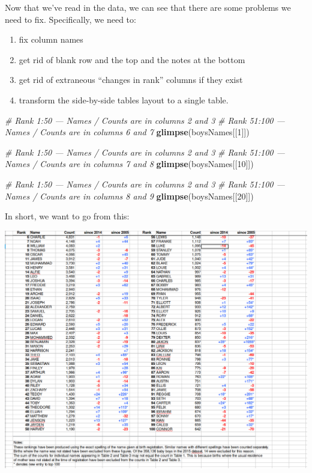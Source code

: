 \documentclass[
]{book}
\newenvironment{Shaded}{\begin{snugshade}}{\end{snugshade}}
\newcommand{\CommentTok}[1]{\textcolor[rgb]{0.56,0.35,0.01}{\textit{#1}}}
\newcommand{\DecValTok}[1]{\textcolor[rgb]{0.00,0.00,0.81}{#1}}
\newcommand{\KeywordTok}[1]{\textcolor[rgb]{0.13,0.29,0.53}{\textbf{#1}}}
\newcommand{\NormalTok}[1]{#1}
\providecommand{\tightlist}{%
  \setlength{\itemsep}{0pt}\setlength{\parskip}{0pt}}
\begin{document}
Now that we've read in the data, we can see that there are some
problems we need to fix. Specifically, we need to:

\begin{enumerate}
\def\labelenumi{\arabic{enumi}.}
\tightlist
\item
  fix column names
\item
  get rid of blank row and the top and the notes at the bottom
\item
  get rid of extraneous ``changes in rank'' columns if they exist
\item
  transform the side-by-side tables layout to a single table.
\end{enumerate}

\begin{Shaded}
\begin{Highlighting}[]
\CommentTok{# Rank 1:50 --- Names / Counts are in columns 2 and 3 }
\CommentTok{# Rank 51:100 --- Names / Counts are in columns 6 and 7}
\KeywordTok{glimpse}\NormalTok{(boysNames[[}\DecValTok{1}\NormalTok{]]) }

\CommentTok{# Rank 1:50 --- Names / Counts are in columns 2 and 3 }
\CommentTok{# Rank 51:100 --- Names / Counts are in columns 7 and 8}
\KeywordTok{glimpse}\NormalTok{(boysNames[[}\DecValTok{10}\NormalTok{]]) }

\CommentTok{# Rank 1:50 --- Names / Counts are in columns 2 and 3 }
\CommentTok{# Rank 51:100 --- Names / Counts are in columns 8 and 9}
\KeywordTok{glimpse}\NormalTok{(boysNames[[}\DecValTok{20}\NormalTok{]]) }
\end{Highlighting}
\end{Shaded}

In short, we want to go from this:

\includegraphics{R/RDataWrangling/images/messy.png}
\end{document}
